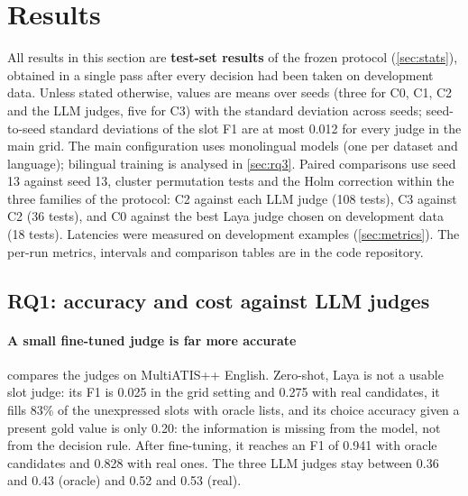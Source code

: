 \section{Results}
\label{sec:results}

All results in this section are \textbf{test-set results} of the frozen protocol (\cref{sec:stats}), obtained in a single pass after every decision had been taken on development data. Unless stated otherwise, values are means over seeds (three for C0, C1, C2 and the LLM judges, five for C3) with the standard deviation across seeds; seed-to-seed standard deviations of the slot F1 are at most 0.012 for every judge in the main grid. The main configuration uses monolingual models (one per dataset and language); bilingual training is analysed in \cref{sec:rq3}. Paired comparisons use seed 13 against seed 13, cluster permutation tests and the Holm correction within the three families of the protocol: C2 against each LLM judge (108 tests), C3 against C2 (36 tests), and C0 against the best Laya judge chosen on development data (18 tests). Latencies were measured on development examples (\cref{sec:metrics}). The per-run metrics, intervals and comparison tables are in the code repository.

\subsection{RQ1: accuracy and cost against LLM judges}
\label{sec:rq1}

\paragraph{A small fine-tuned judge is far more accurate}  compares the judges on MultiATIS++ English. Zero-shot, Laya is not a usable slot judge: its F1 is 0.025 in the grid setting and 0.275 with real candidates, it fills 83\% of the unexpressed slots with oracle lists, and its choice accuracy given a present gold value is only 0.20: the information is missing from the model, not from the decision rule. After fine-tuning, it reaches an F1 of 0.941 with oracle candidates and 0.828 with real ones. The three LLM judges stay between 0.36 and 0.43 (oracle) and 0.52 and 0.53 (real).

